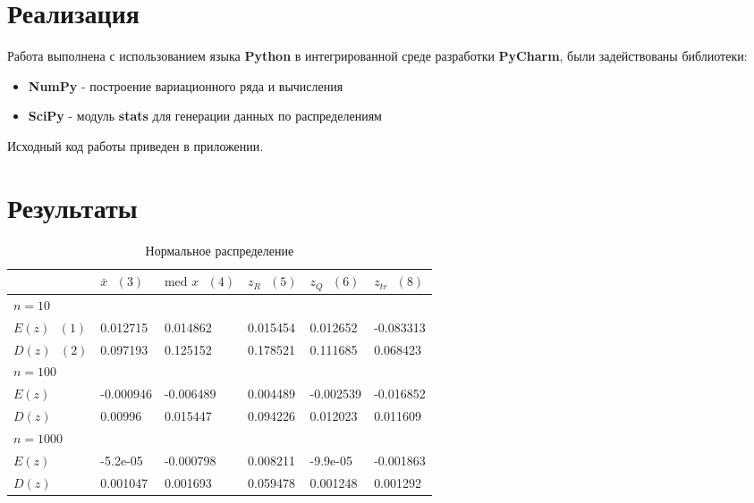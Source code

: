 \documentclass[12pt,a4paper]{article}
\begin{document}
\pagebreak

\section{Реализация}
Работа выполнена с использованием языка \textbf{Python} в интегрированной среде разработки \textbf{PyCharm}, были задействованы библиотеки:

\begin{itemize}
	\item \textbf{NumPy} - построение вариационного ряда и вычисления
	\item \textbf{SciPy} - модуль \textbf{stats} для генерации данных по распределениям
\end{itemize}

Исходный код работы приведен в приложении. 
\pagebreak

\section{Результаты}

\begin{table}[h!]
	\centering
	\begin{tabular}{|l|l|l|l|l|l|}
		\hline&$\bar x\text{	} \hyperref[3]{(3)}$ &$\text{med }x\text{	} \hyperref[4]{(4)}$  &$z_R\text{	} \hyperref[5]{(5)}$  &$z_Q\text{	} \hyperref[6]{(6)}$  &$z_{tr}\text{	} \hyperref[8]{(8)}$  \\ \hline
		
		$n=10$&&&&& \\ \hline$E(z) \text{	} \hyperref[1]{(1)}$&0.012715&0.014862&0.015454&0.012652&-0.083313 \\ \hline$D(z) \text{	} \hyperref[2]{(2)}$&0.097193&0.125152&0.178521&0.111685&0.068423 \\ \hline
		
		$n=100$&&&&& \\ \hline$E(z)$&-0.000946&-0.006489&0.004489&-0.002539&-0.016852 \\ \hline$D(z)$&0.00996&0.015447&0.094226&0.012023&0.011609 \\ \hline
		
		$n=1000$&&&&& \\ \hline$E(z)$&-5.2e-05&-0.000798&0.008211&-9.9e-05&-0.001863 \\ \hline$D(z)$&0.001047&0.001693&0.059478&0.001248&0.001292 \\ \hline
		
	\end{tabular}
	\caption{Нормальное распределение}
\end{table}
\end{document}
